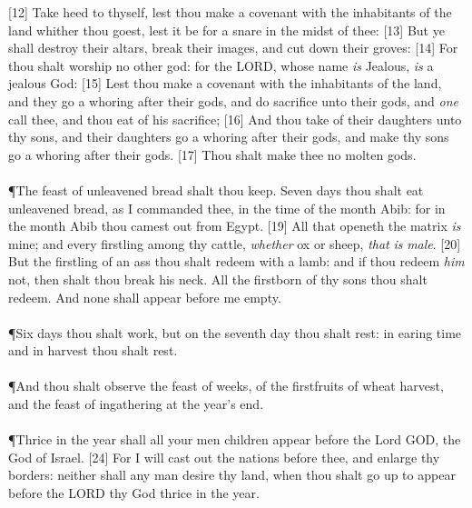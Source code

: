 [12] \textcolor[cmyk]{0.99998,1,0,0}{Take heed to thyself, lest thou make a covenant with the inhabitants of the land whither thou goest, lest it be for a snare in the midst of thee:}
[13] \textcolor[cmyk]{0.99998,1,0,0}{But ye shall destroy their altars, break their images, and cut down their groves:}
[14] \textcolor[cmyk]{0.99998,1,0,0}{For thou shalt worship no other god: for the LORD, whose name \emph{is} Jealous, \emph{is} a jealous God:}
[15] \textcolor[cmyk]{0.99998,1,0,0}{Lest thou make a covenant with the inhabitants of the land, and they go a whoring after their gods, and do sacrifice unto their gods, and \emph{one} call thee, and thou eat of his sacrifice;}
[16] \textcolor[cmyk]{0.99998,1,0,0}{And thou take of their daughters unto thy sons, and their daughters go a whoring after their gods, and make thy sons go a whoring after their gods.}
[17] \textcolor[cmyk]{0.99998,1,0,0}{Thou shalt make thee no molten gods.}\\
\\
\P \textcolor[cmyk]{0.99998,1,0,0}{The feast of unleavened bread shalt thou keep. Seven days thou shalt eat unleavened bread, as I commanded thee, in the time of the month Abib: for in the month Abib thou camest out from Egypt.}
[19] \textcolor[cmyk]{0.99998,1,0,0}{All that openeth the matrix \emph{is} mine; and every firstling among thy cattle, \emph{whether} ox or sheep, \emph{that} \emph{is} \emph{male}.}
[20] \textcolor[cmyk]{0.99998,1,0,0}{But the firstling of an ass thou shalt redeem with a lamb: and if thou redeem \emph{him} not, then shalt thou break his neck. All the firstborn of thy sons thou shalt redeem. And none shall appear before me empty.}\\
\\
\P \textcolor[cmyk]{0.99998,1,0,0}{Six days thou shalt work, but on the seventh day thou shalt rest: in earing time and in harvest thou shalt rest.}\\
\\
\P \textcolor[cmyk]{0.99998,1,0,0}{And thou shalt observe the feast of weeks, of the firstfruits of wheat harvest, and the feast of ingathering at the year's end.}\\
\\
\P \textcolor[cmyk]{0.99998,1,0,0}{Thrice in the year shall all your men children appear before the Lord GOD, the God of Israel.}
[24] \textcolor[cmyk]{0.99998,1,0,0}{For I will cast out the nations before thee, and enlarge thy borders: neither shall any man desire thy land, when thou shalt go up to appear before the LORD thy God thrice in the year.}
